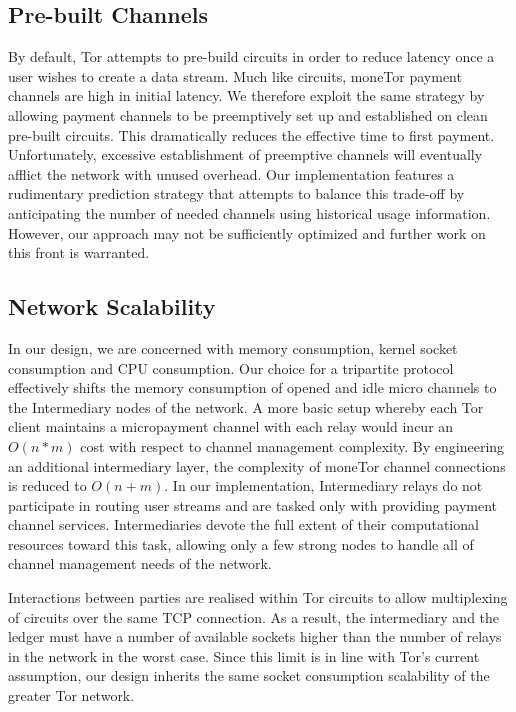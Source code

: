 \subsection{Pre-built Channels}
By default, Tor attempts to pre-build circuits in order to reduce latency once a
user wishes to create a data stream. Much like circuits, moneTor payment
channels are high in initial latency. We therefore exploit the same strategy by
allowing payment channels to be preemptively set up and established on clean
pre-built circuits. This dramatically reduces the effective time to first
payment. Unfortunately, excessive establishment of preemptive channels will
eventually afflict the network with unused overhead. Our implementation features
a rudimentary prediction strategy that attempts to balance this trade-off by
anticipating the number of needed channels using historical usage
information. However, our approach may not be sufficiently optimized and further
work on this front is warranted.

\subsection{Network Scalability}
\label{subsub:scalability}

In our design, we are concerned with memory consumption, kernel socket
consumption and CPU consumption. Our choice for a tripartite protocol
effectively shifts the memory consumption of opened and idle micro channels to
the Intermediary nodes of the network. A more basic setup whereby each Tor
client maintains a micropayment channel with each relay would incur an $O(n*m)$
cost with respect to channel management complexity. By engineering an additional
intermediary layer, the complexity of moneTor channel connections is reduced to
$O(n+m)$. In our implementation, Intermediary relays do not participate in
routing user streams and are tasked only with providing payment channel
services. Intermediaries devote the full extent of their computational resources
toward this task, allowing only a few strong nodes to handle all of channel
management needs of the network.

Interactions between parties are realised within Tor circuits to allow
multiplexing of circuits over the same TCP connection. As a result, the
intermediary and the ledger must have a number of available sockets higher than
the number of relays in the network in the worst case. Since this limit is in
line with Tor's current assumption, our design inherits the same socket
consumption scalability of the greater Tor network.

